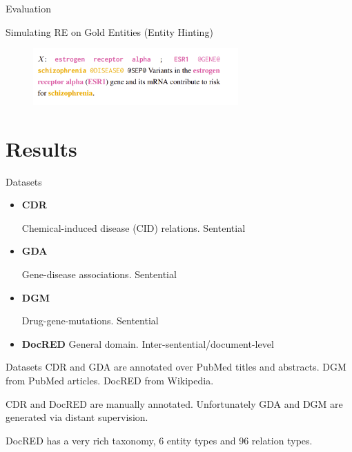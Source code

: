 \documentclass[usenames,dvipsnames,pdf]{beamer}
\begin{document}
        \begin{frame}{Evaluation}
          
        \end{frame}

        \begin{frame}{Simulating RE on Gold Entities (Entity Hinting)}
          \begin{figure}
            \includegraphics[width=0.7\textwidth,height=0.7\textheight,keepaspectratio]{entity_hint} 
          \end{figure}
        \end{frame}
        
        \section{Results}

        \begin{frame}{Datasets}
          \begin{itemize}
          \item \textbf{CDR}


            Chemical-induced disease (CID) relations.  Sentential 
          \item \textbf{GDA}


            Gene-disease associations.  Sentential    
          \item \textbf{DGM}

            Drug-gene-mutations.  Sentential
          \item \textbf{DocRED}
            General domain.  Inter-sentential/document-level
            
          \end{itemize}
        \end{frame}

        \begin{frame}{Datasets}
          CDR and GDA are annotated over PubMed titles and abstracts.
          DGM from PubMed articles.
          DocRED from Wikipedia. \hfill \break \hfill \break
          
          
          CDR and DocRED are manually annotated.
          Unfortunately GDA and DGM are generated via distant supervision.\hfill \break \hfill \break

        
          
          DocRED has a very rich taxonomy, 6 entity types and 96 relation types.
        \end{frame}
\end{document}
